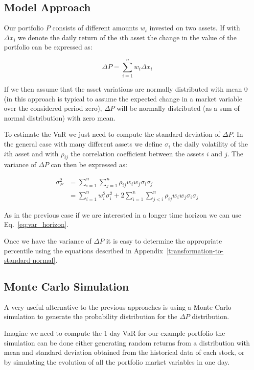 \subsection{Model Approach}\label{model-approach}

Our portfolio \(P\) consists of different amounts \(w_i\)
invested on two assets. If with \(\Delta x_i\) we denote the daily
return of the $i$th asset the change in the value of the portfolio can be
expressed as:

\[\Delta P = \sum_{i=1}^n w_i \Delta x_i\]

If we then assume that the asset variations are normally distributed
with mean 0 (in this approach is typical to assume the expected change
in a market variable over the considered period zero), \(\Delta P\) will
be normally distributed (as a sum of normal distribution) with zero
mean.

To estimate the VaR we just need to compute the standard deviation of
\(\Delta P\). In the general case with many different assets we define
\(\sigma_i\) the daily volatility of the $i$th asset and with
\(\rho_{ij}\) the correlation coefficient between the assets $i$ and $j$.
The variance of \(\Delta P\) can then be expressed as:

\begin{align*}\sigma^2_P & = \sum_{i=1}^{n}\sum_{j=1}^{n}\rho_{ij}w_i w_j \sigma_i \sigma_j \\
& = \sum_{i=1}^{n} w_i^2 \sigma_i^2 + 2 \sum_{i=1}^{n}\sum_{j<i}^{n}\rho_{ij}w_i w_j \sigma_i \sigma_j 
\end{align*}

As in the previous case if we are interested in a longer time horizon we
can use Eq.~\ref{eq:var_horizon}.

Once we have the variance of \(\Delta P\) it is easy to determine the appropriate percentile using the equations described in Appendix~\ref{transformation-to-standard-normal}.


\subsection{Monte Carlo Simulation}\label{monte-carlo-simulation}

A very useful alternative to the previous approaches is using a Monte
Carlo simulation to generate the probability distribution for the
\(\Delta P\) distribution. 

Imagine we need to compute the 1-day VaR for our example portfolio
the simulation can be done either generating random returns from a distribution with mean and standard deviation obtained from the historical data of each stock, or by simulating the evolution 
of all the portfolio market variables in one day.


